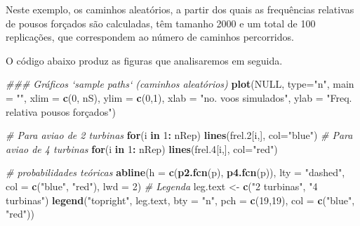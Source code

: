\documentclass[
]{book}
\newenvironment{Shaded}{\begin{snugshade}}{\end{snugshade}}
\newcommand{\CommentTok}[1]{\textcolor[rgb]{0.56,0.35,0.01}{\textit{#1}}}
\newcommand{\ControlFlowTok}[1]{\textcolor[rgb]{0.13,0.29,0.53}{\textbf{#1}}}
\newcommand{\DataTypeTok}[1]{\textcolor[rgb]{0.13,0.29,0.53}{#1}}
\newcommand{\DecValTok}[1]{\textcolor[rgb]{0.00,0.00,0.81}{#1}}
\newcommand{\FloatTok}[1]{\textcolor[rgb]{0.00,0.00,0.81}{#1}}
\newcommand{\KeywordTok}[1]{\textcolor[rgb]{0.13,0.29,0.53}{\textbf{#1}}}
\newcommand{\NormalTok}[1]{#1}
\newcommand{\OperatorTok}[1]{\textcolor[rgb]{0.81,0.36,0.00}{\textbf{#1}}}
\newcommand{\OtherTok}[1]{\textcolor[rgb]{0.56,0.35,0.01}{#1}}
\newcommand{\StringTok}[1]{\textcolor[rgb]{0.31,0.60,0.02}{#1}}
\theoremstyle{definition}
\theoremstyle{definition}
\theoremstyle{definition}
\theoremstyle{remark}
\begin{document}
Neste exemplo, os caminhos aleatórios, a partir dos quais as frequências relativas de pousos forçados são calculadas, têm tamanho 2000 e um total de 100 replicações, que correspondem ao número de caminhos percorridos.

O código abaixo produz as figuras que analisaremos em seguida.

\begin{Shaded}
\begin{Highlighting}[]
\CommentTok{### Gráficos `sample paths` (caminhos aleatórios)}
\KeywordTok{plot}\NormalTok{(}\OtherTok{NULL}\NormalTok{, }\DataTypeTok{type=}\StringTok{"n"}\NormalTok{, }\DataTypeTok{main =} \StringTok{""}\NormalTok{,}
     \DataTypeTok{xlim =} \KeywordTok{c}\NormalTok{(}\DecValTok{0}\NormalTok{, nS), }\DataTypeTok{ylim =} \KeywordTok{c}\NormalTok{(}\DecValTok{0}\NormalTok{,}\DecValTok{1}\NormalTok{),}
     \DataTypeTok{xlab =} \StringTok{"no. voos simulados"}\NormalTok{,}
     \DataTypeTok{ylab =} \StringTok{"Freq. relativa pousos forçados"}\NormalTok{)}

\CommentTok{# Para aviao de 2 turbinas}
\ControlFlowTok{for}\NormalTok{(i }\ControlFlowTok{in} \DecValTok{1}\OperatorTok{:}\StringTok{ }\NormalTok{nRep) }\KeywordTok{lines}\NormalTok{(frel}\FloatTok{.2}\NormalTok{[i,], }\DataTypeTok{col=}\StringTok{"blue"}\NormalTok{) }
\CommentTok{# Para aviao de 4 turbinas}
\ControlFlowTok{for}\NormalTok{(i }\ControlFlowTok{in} \DecValTok{1}\OperatorTok{:}\StringTok{ }\NormalTok{nRep) }\KeywordTok{lines}\NormalTok{(frel}\FloatTok{.4}\NormalTok{[i,], }\DataTypeTok{col=}\StringTok{"red"}\NormalTok{)}

\CommentTok{# probabilidades teóricas}
\KeywordTok{abline}\NormalTok{(}\DataTypeTok{h =} \KeywordTok{c}\NormalTok{(}\KeywordTok{p2.fcn}\NormalTok{(p), }\KeywordTok{p4.fcn}\NormalTok{(p)), }
       \DataTypeTok{lty =} \StringTok{"dashed"}\NormalTok{, }\DataTypeTok{col =} \KeywordTok{c}\NormalTok{(}\StringTok{"blue"}\NormalTok{, }\StringTok{"red"}\NormalTok{), }\DataTypeTok{lwd =} \DecValTok{2}\NormalTok{)}
\CommentTok{# Legenda}
\NormalTok{leg.text <-}\StringTok{ }\KeywordTok{c}\NormalTok{(}\StringTok{"2 turbinas"}\NormalTok{, }\StringTok{"4 turbinas"}\NormalTok{)}
\KeywordTok{legend}\NormalTok{(}\StringTok{"topright"}\NormalTok{, leg.text, }
       \DataTypeTok{bty =} \StringTok{"n"}\NormalTok{, }\DataTypeTok{pch =} \KeywordTok{c}\NormalTok{(}\DecValTok{19}\NormalTok{,}\DecValTok{19}\NormalTok{), }\DataTypeTok{col =} \KeywordTok{c}\NormalTok{(}\StringTok{"blue"}\NormalTok{, }\StringTok{"red"}\NormalTok{))}


\end{Highlighting}
\end{Shaded}
\end{document}
